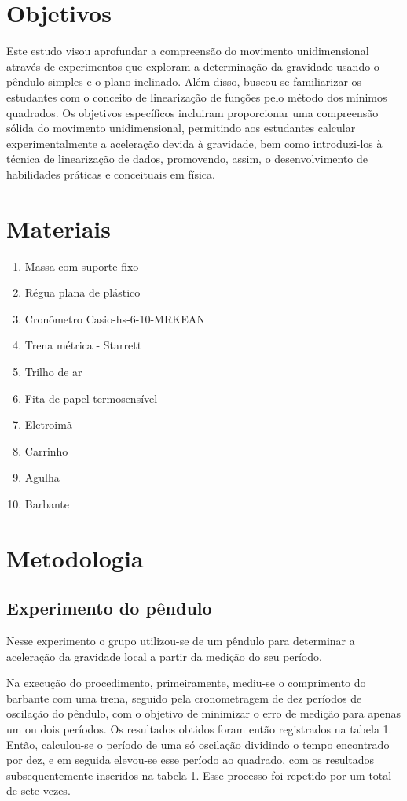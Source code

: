 \documentclass[12pt, letterpaper]{article}
\begin{document}
\section{Objetivos}
Este estudo visou aprofundar a compreensão do movimento unidimensional através de experimentos que exploram a determinação da gravidade usando o pêndulo simples e o plano inclinado. Além disso, buscou-se familiarizar os estudantes com o conceito de linearização de funções pelo método dos mínimos quadrados. Os objetivos específicos incluiram proporcionar uma compreensão sólida do movimento unidimensional, permitindo aos estudantes calcular experimentalmente a aceleração devida à gravidade, bem como introduzi-los à técnica de linearização de dados, promovendo, assim, o desenvolvimento de habilidades práticas e conceituais em física.



\section{Materiais}
    \begin{enumerate} 
        \item Massa com suporte fixo 
        \item Régua plana de plástico
        \item Cronômetro Casio-hs-6-10-MRKEAN
        \item Trena métrica - Starrett
        \item Trilho de ar
        \item Fita de papel termosensível
        \item Eletroimã
        \item Carrinho
        \item Agulha
        \item Barbante
    \end{enumerate}
\section{Metodologia}
    \subsection{Experimento do pêndulo}
    Nesse experimento o grupo utilizou-se de um pêndulo para determinar a aceleração da gravidade local a partir da medição do seu período.

    
   Na execução do procedimento, primeiramente, mediu-se o comprimento do barbante com uma trena, seguido pela cronometragem de dez períodos de oscilação do pêndulo, com o objetivo de minimizar o erro de medição para apenas um ou dois períodos. Os resultados obtidos foram então registrados na tabela 1. Então, calculou-se o período de uma só oscilação dividindo o tempo encontrado por dez, e em seguida elevou-se esse período ao quadrado, com os resultados subsequentemente inseridos na tabela 1. Esse processo foi repetido por um total de sete vezes.
\end{document}
